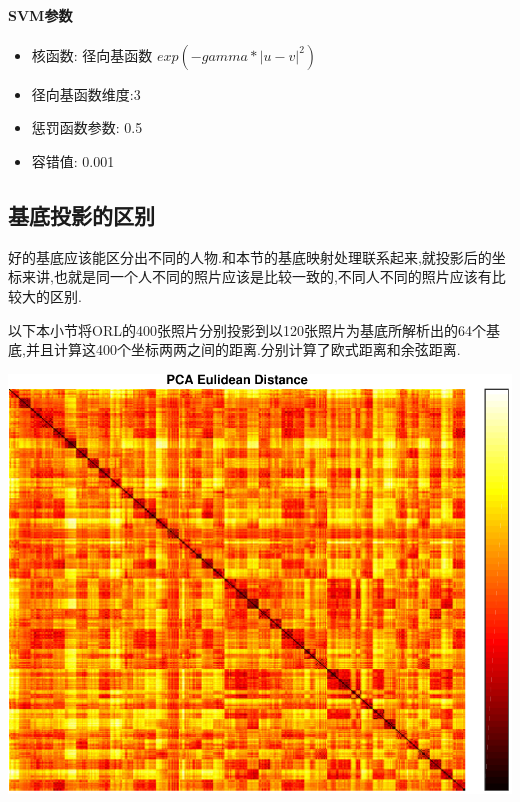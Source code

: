	
	\paragraph{SVM参数}
	\begin{itemize}
		\item 核函数: 径向基函数 $exp(-gamma*|u-v|^2)$
		\item 径向基函数维度:3
		\item 惩罚函数参数: 0.5
		\item 容错值: 0.001
	\end{itemize}
	
\subsection{基底投影的区别}
\label{sec:pnibase}
好的基底应该能区分出不同的人物.和本节的基底映射处理联系起来,就投影后的坐标来讲,也就是同一个人不同的照片应该是比较一致的,不同人不同的照片应该有比较大的区别.\newline

以下本小节将ORL的400张照片分别投影到以120张照片为基底所解析出的64个基底,并且计算这400个坐标两两之间的距离.分别计算了欧式距离和余弦距离.


\begin{center}
\begin{minipage}[t]{\linewidth}
\center
{
\includegraphics[width=\MyFactor\textwidth]{Img/pcaeu} 
}
\end{minipage}
\medskip
\end{center}

